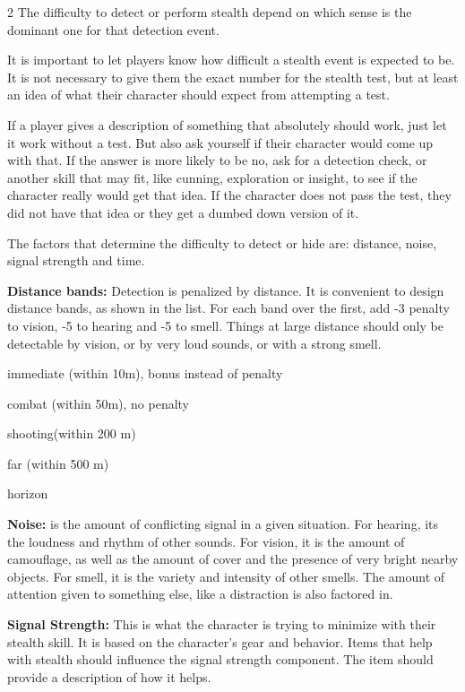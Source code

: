 \begin{multicols}{2}
The difficulty to detect or perform stealth depend on which sense is the dominant one for that detection event. 

It is important to let players know how difficult a stealth event is expected to be. It is not necessary to give them the exact number for the stealth test, but at least an idea of what their character should expect from attempting a test.

If a player gives a description of something that absolutely should work, just let it work without a test. But also ask yourself if their character would come up with that. If the answer is more likely to be no, ask for a detection check, or another skill that may fit, like cunning, exploration or insight, to see if the character really would get that idea. If the character does not pass the test, they did not have that idea or they get a dumbed down version of it. 

The factors that determine the difficulty to detect or hide are: distance, noise, signal strength and time.

\textbf{Distance bands:} Detection is penalized by distance. It is convenient to design distance bands, as shown in the list. For each band over the first, add -3 penalty to vision, -5 to hearing and -5 to smell. Things at large distance should only be detectable by vision, or by very loud sounds, or with a strong smell.

\begin{proplist}
    \item immediate (within 10m), bonus instead of penalty
    \item combat (within 50m), no penalty
    \item shooting(within 200 m)
    \item far (within 500 m)
    \item horizon
\end{proplist}

\textbf{Noise:} is the amount of conflicting signal in a given situation. For hearing, its the loudness and rhythm of other sounds. For vision, it is the amount of camouflage, as well as the amount of cover and the presence of very bright nearby objects. For smell, it is the variety and intensity of other smells. The amount of attention given to something else, like a distraction is also factored in.

\textbf{Signal Strength:} This is what the character is trying to minimize with their stealth skill. It is based on the character's gear and behavior. Items that help with stealth should influence the signal strength component. The item should provide a description of how it helps.


\end{multicols}
